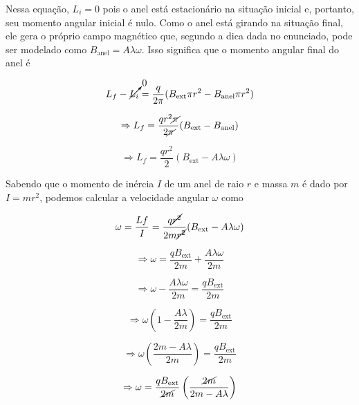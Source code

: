 \documentclass[
	article,
	11pt,
	oneside,
	a4paper,
	english,
	brazil,
	sumario=tradicional
	]{abntex2}
\begin{document}
Nessa equação, $L_i = 0$ pois o anel está estacionário na situação inicial e, portanto, seu momento angular inicial é nulo. Como o anel está girando na situação final, ele gera o próprio campo magnético que, segundo a dica dada no enunciado, pode ser modelado como $B_{\text{anel}} = A\lambda\omega$. Isso significa que o momento angular final do anel é

\begin{equation}
    L_f - \cancelto{0}{L_i}= \frac{q}{2\pi}(B_{\text{ext}}\pi r^2 - B_{\text{anel}} \pi r^2)
\end{equation}

\begin{equation}
    \Rightarrow L_f = \frac{q r^2 \cancel{\pi}}{2\cancel{\pi}} (B_{\text{ext}} - B_{\text{anel}})
\end{equation}

\begin{equation}
    \Rightarrow L_f = \frac{q r^2}{2} (B_{\text{ext}} - A\lambda\omega)
\end{equation}

Sabendo que o momento de inércia $I$ de um anel de raio $r$ e massa $m$ é dado por $I = mr^2$, podemos calcular a velocidade angular $\omega$ como

\begin{equation}
    \omega = \frac{Lf}{I} = \frac{q \cancel{r^2}}{2m \cancel{r^2}}(B_{\text{ext}} - A\lambda\omega)
\end{equation}

\begin{equation}
    \Rightarrow \omega = \frac{qB_{\text{ext}}}{2m} + \frac{A\lambda\omega}{2m}
\end{equation}

\begin{equation}
    \Rightarrow \omega - \frac{A\lambda\omega}{2m} = \frac{qB_{\text{ext}}}{2m}
\end{equation}

\begin{equation}
    \Rightarrow \omega \left(1 - \frac{A\lambda}{2m} \right)= \frac{qB_{\text{ext}}}{2m}
\end{equation}

\begin{equation}
    \Rightarrow \omega \left(\frac{2m - A\lambda}{2m} \right)= \frac{qB_{\text{ext}}}{2m}
\end{equation}

\begin{equation}
    \Rightarrow \omega = \frac{qB_{\text{ext}}}{\cancel{2m}}\left(\frac{\cancel{2m}}{2m - A\lambda} \right)
\end{equation}
\end{document}
